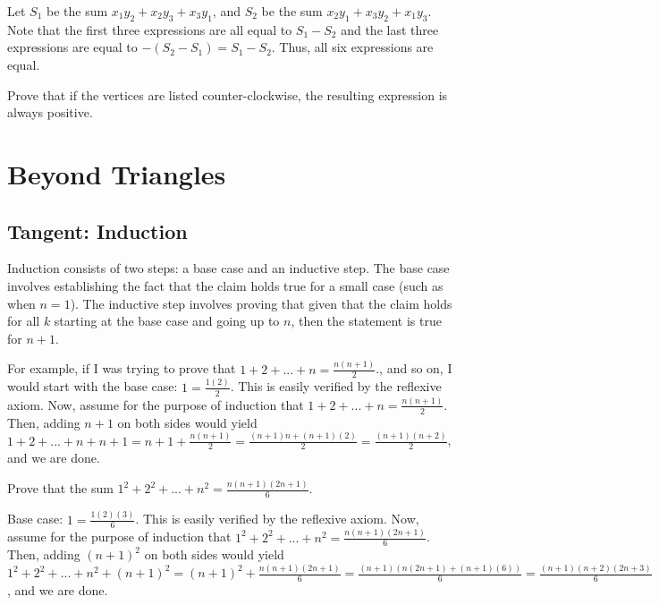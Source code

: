 \documentclass[11pt]{article}
\begin{document}
\begin{solution}
Let $S_1$ be the sum $x_1y_2 + x_2y_3 + x_3y_1$, and $S_2$ be the sum $x_2y_1 + x_3y_2 + x_1y_3$.
Note that the first three expressions are all equal to $S_1-S_2$ and the last three expressions are equal to $-(S_2-S_1) = S_1-S_2$. Thus, all six expressions are equal.
\end{solution}
\begin{problem}
Prove that if the vertices are listed counter-clockwise, the resulting expression is always positive.
\end{problem}

\section{Beyond Triangles}

\subsection{Tangent: Induction}

Induction consists of two steps: a base case and an inductive step. The base case involves establishing the fact that the claim holds true for a small case (such as when $n=1$). The inductive step involves proving that given that the claim holds for all $k$ starting at the base case and going up to $n$, then the statement is true for $n+1$.

For example, if I was trying to prove that $1+2+...+n = \frac{n(n+1)}{2}$., and so on, I would start with the base case: $1=\frac{1(2)}{2}$. This is easily verified by the reflexive axiom. Now, assume for the purpose of induction that $1+2+...+n = \frac{n(n+1)}{2}$. Then, adding $n+1$ on both sides would yield $1+2+...+n+n+1=n+1+\frac{n(n+1)}{2} = \frac{(n+1)n + (n+1)(2)}{2} = \frac{(n+1)(n+2)}{2}$, and we are done.

\begin{problem}
Prove that the sum $1^2+2^2+...+n^2 = \frac{n(n+1)(2n+1)}{6}$.
\end{problem}

\begin{solution}
Base case: $1=\frac{1(2)(3)}{6}$. This is easily verified by the reflexive axiom. Now, assume for the purpose of induction that $1^2+2^2+...+n^2 = \frac{n(n+1)(2n+1)}{6}$. Then, adding $(n+1)^2$ on both sides would yield $1^2+2^2+...+n^2+(n+1)^2=(n+1)^2+\frac{n(n+1)(2n+1)}{6} = \frac{(n+1)(n(2n+1) + (n+1)(6))}{6} = \frac{(n+1)(n+2)(2n+3)}{6}$, and we are done.

\end{solution}
\end{document}
